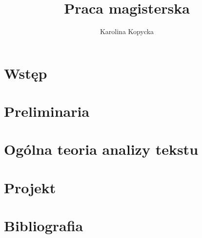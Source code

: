 \documentclass[10pt,a4paper]{report}
\author{Karolina Kopycka}
\title{Praca magisterska}
\begin{document}
\tableofcontents

\chapter{Wstęp}

\chapter{Preliminaria}

\chapter{Ogólna teoria analizy tekstu}

\chapter{Projekt}

\chapter{Bibliografia}
\end{document}
